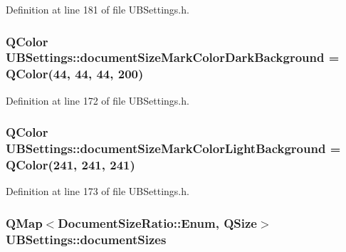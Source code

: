 Definition at line 181 of file U\-B\-Settings.\-h.

\hypertarget{class_u_b_settings_a4cb6c93982e98da81931f1391db0013c}{
\subsubsection[{document\-Size\-Mark\-Color\-Dark\-Background}]{\setlength{\rightskip}{0pt plus 5cm}Q\-Color U\-B\-Settings\-::document\-Size\-Mark\-Color\-Dark\-Background = Q\-Color(44, 44, 44, 200)\hspace{0.3cm}{\ttfamily [static]}}}\label{db/d66/class_u_b_settings_a4cb6c93982e98da81931f1391db0013c}


Definition at line 172 of file U\-B\-Settings.\-h.

\hypertarget{class_u_b_settings_aa78cc4d102e64bef9bbb508e525fde57}{
\subsubsection[{document\-Size\-Mark\-Color\-Light\-Background}]{\setlength{\rightskip}{0pt plus 5cm}Q\-Color U\-B\-Settings\-::document\-Size\-Mark\-Color\-Light\-Background = Q\-Color(241, 241, 241)\hspace{0.3cm}{\ttfamily [static]}}}\label{db/d66/class_u_b_settings_aa78cc4d102e64bef9bbb508e525fde57}


Definition at line 173 of file U\-B\-Settings.\-h.

\hypertarget{class_u_b_settings_a2c7e1b2471296349a87237358c932077}{
\subsubsection[{document\-Sizes}]{\setlength{\rightskip}{0pt plus 5cm}Q\-Map$<${\bf Document\-Size\-Ratio\-::\-Enum}, Q\-Size$>$ U\-B\-Settings\-::document\-Sizes}}\label{db/d66/class_u_b_settings_a2c7e1b2471296349a87237358c932077}


